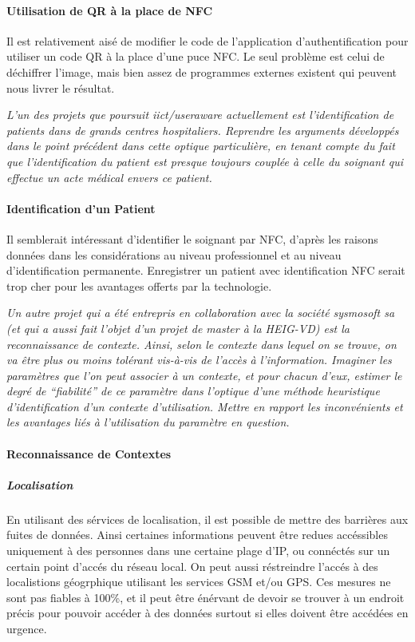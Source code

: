 \documentclass[a4paper,11pt,titlepage]{article}
\begin{document}
\paragraph{Utilisation de QR à la place de NFC}

Il est relativement aisé de modifier le code de l'application d'authentification pour utiliser un code QR à la place d'une puce NFC.
Le seul problème est celui de déchiffrer l'image, mais bien assez de programmes externes existent qui peuvent nous livrer le résultat.

\textit{L'un des projets que poursuit iict/useraware actuellement est l'identification de patients dans de
grands centres hospitaliers. Reprendre les arguments développés dans le point précédent dans cette
optique particulière, en tenant compte du fait que l'identification du patient est presque toujours couplée à
celle du soignant qui effectue un acte médical envers ce patient.}

\paragraph{Identification d'un Patient}
Il semblerait intéressant d'identifier le soignant par NFC, d'après les raisons données dans les considérations au niveau professionnel et au niveau d'identification permanente.
Enregistrer un patient avec identification NFC serait trop cher pour les avantages offerts par la technologie.

\textit{Un autre projet qui a été entrepris en collaboration avec la société sysmosoft sa (et qui a aussi fait
l'objet d'un projet de master à la HEIG-VD) est la reconnaissance  de contexte. Ainsi, selon le contexte dans
lequel on se trouve, on va être plus ou moins tolérant vis-à-vis de l'accès à l'information. Imaginer les
paramètres que l'on peut associer à un contexte, et pour chacun d'eux, estimer le degré de ``fiabilité'' de
ce paramètre dans l'optique d'une méthode heuristique d'identification d'un contexte d'utilisation. Mettre
en rapport les inconvénients et les avantages liés à l'utilisation du paramètre en question.}

\paragraph{Reconnaissance de Contextes}
\subparagraph{Localisation}

En utilisant des sérvices de localisation, il est possible de mettre des barrières aux fuites de données.
Ainsi certaines informations peuvent être redues accéssibles uniquement à des personnes dans une certaine plage d'IP, ou connéctés sur un certain point d'accés du réseau local.
On peut aussi réstreindre l'accés à des localistions géogrphique utilisant les services GSM et/ou GPS.
Ces mesures ne sont pas fiables à 100\%, et il peut être énérvant de devoir se trouver à un endroit précis pour pouvoir accéder à des données surtout si elles doivent être accédées en urgence.
\end{document}
